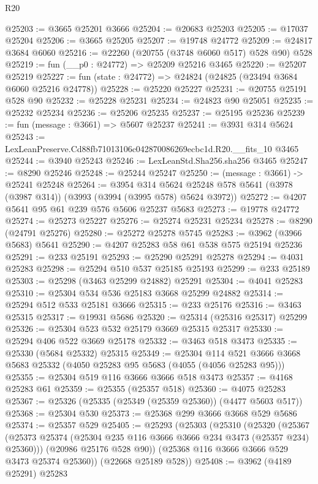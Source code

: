 \begin{lexlean}{R20}
\begin{coremodule}
@25203 := @3665 @25201 @3666
@25204 := @20683 @25203
@25205 := @17037 @25204
@25206 := @3665 @25205
@25207 := @19748 @24772
@25209 := @24817 @3684 @6060
@25216 := @22260 (@20755 (@3748 @6060 @517) @528 @90) @528
@25219 := fun (__p0 : @24772) => @25209 @25216 @3465
@25220 := @25207 @25219
@25227 := fun (state : @24772) => @24824 (@24825 (@23494 @3684 @6060 @25216 @24778))
@25228 := @25220 @25227
@25231 := @20755 @25191 @528 @90
@25232 := @25228 @25231
@25234 := @24823 @90 @25051
@25235 := @25232 @25234
@25236 := @25206 @25235
@25237 := @25195 @25236
@25239 := fun (message : @3661) => @5607 @25237
@25241 := @3931 @314 @5624
@25243 := LexLeanPreserve.Cd88fb71013106c042870086269ecbc1d.R20.__fits_10 @3465
@25244 := @3940 @25243
@25246 := LexLeanStd.Sha256.sha256 @3465
@25247 := @8290 @25246
@25248 := @25244 @25247
@25250 := (message : @3661) -> @25241 @25248
@25264 := @3954
    @314
    @5624
    @25248
    @578
    @5641
    (@3978 (@3987 @314))
    (@3993 (@3994 (@3995 @578) @5624 @3972))
@25272 := @4207 @5641 @95 @61 @239 @576 @5606 @25237 @5683
@25273 := @19778 @24772
@25274 := @25273 @25227
@25276 := @25274 @25231 @25234
@25278 := @8290 (@24791 @25276)
@25280 := @25272 @25278 @5745
@25283 := @3962 (@3966 @5683) @5641
@25290 := @4207 @25283 @58 @61 @538 @575 @25194 @25236
@25291 := @233 @25191
@25293 := @25290 @25291 @25278
@25294 := @4031 @25283
@25298 := @25294 @510 @537 @25185 @25193
@25299 := @233 @25189
@25303 := @25298 (@3463 @25299 @24882) @25291
@25304 := @4041 @25283
@25310 := @25304 @534 @536 @25183 @3668 @25299 @24882
@25314 := @25294 @512 @533 @25181 @3666
@25315 := @233 @25176
@25316 := @3463 @25315
@25317 := @19931 @5686
@25320 := @25314 (@25316 @25317) @25299
@25326 := @25304 @523 @532 @25179 @3669 @25315 @25317
@25330 := @25294 @406 @522 @3669 @25178
@25332 := @3463 @518 @3473
@25335 := @25330 (@5684 @25332) @25315
@25349 := @25304
    @114
    @521
    @3666
    @3668
    @5683
    @25332
    (@4050 @25283 @95 @5683 (@4055 (@4056 @25283 @95)))
@25355 := @25304 @519 @116 @3666 @3666 @518 @3473
@25357 := @4168 @25283 @61
@25359 := @25355 (@25357 @518)
@25360 := @4075 @25283
@25367 := @25326 (@25335 (@25349 (@25359 @25360)) (@4477 @5603 @517))
@25368 := @25304 @530
@25373 := @25368 @299 @3666 @3668 @529 @5686
@25374 := @25357 @529
@25405 := @25293
    (@25303
      (@25310
        (@25320
          (@25367 (@25373 @25374 (@25304 @235 @116 @3666 @3666 @234 @3473 (@25357 @234) @25360)))
          (@20986 @25176 @528 @90))
        (@25368 @116 @3666 @3666 @529 @3473 @25374 @25360))
      (@22668 @25189 @528))
@25408 := @3962 (@4189 @25291) @25283

\end{coremodule}
\end{lexlean}
